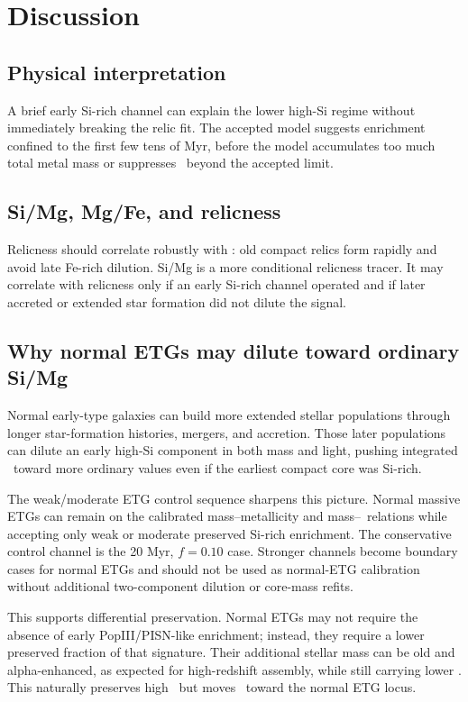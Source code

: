 \section{Discussion}

\subsection{Physical interpretation}

A brief early Si-rich channel can explain the lower high-Si regime without immediately breaking the relic fit. The accepted model suggests enrichment confined to the first few tens of Myr, before the model accumulates too much total metal mass or suppresses \mgfe\ beyond the accepted limit.

\subsection{Si/Mg, Mg/Fe, and relicness}

Relicness should correlate robustly with \mgfe: old compact relics form rapidly and avoid late Fe-rich dilution. Si/Mg is a more conditional relicness tracer. It may correlate with relicness only if an early Si-rich channel operated and if later accreted or extended star formation did not dilute the signal.

\subsection{Why normal ETGs may dilute toward ordinary Si/Mg}

Normal early-type galaxies can build more extended stellar populations through longer star-formation histories, mergers, and accretion. Those later populations can dilute an early high-Si component in both mass and light, pushing integrated \simg\ toward more ordinary values even if the earliest compact core was Si-rich.

The weak/moderate ETG control sequence sharpens this picture. Normal massive ETGs can remain on the calibrated mass--metallicity and mass--\mgfe\ relations while accepting only weak or moderate preserved Si-rich enrichment. The conservative control channel is the 20 Myr, $f=0.10$ case. Stronger channels become boundary cases for normal ETGs and should not be used as normal-ETG calibration without additional two-component dilution or core-mass refits.

This supports differential preservation. Normal ETGs may not require the absence of early PopIII/PISN-like enrichment; instead, they require a lower preserved fraction of that signature. Their additional stellar mass can be old and alpha-enhanced, as expected for high-redshift assembly, while still carrying lower \simg. This naturally preserves high \mgfe\ but moves \simg\ toward the normal ETG locus.

